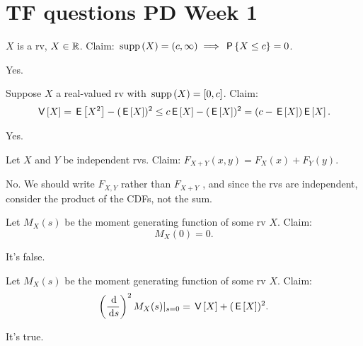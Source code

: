 \documentclass[tf-tutorial-all.tex]{subfiles}
\begin{document}
\setcounter{section}{0}
\section{TF questions PD Week 1}


\begin{truefalse}
$X$ is a rv, $X  \in \mathbb{R}$. Claim: $\,\mathrm{supp}\left(X\right) = (c, \infty) \implies \,\mathsf{P}\left\{X\leq c\right\} = 0$.
\begin{solution}
Yes.
\end{solution}
\end{truefalse}

\begin{truefalse}
Suppose $X$ a real-valued rv with $\,\mathrm{supp}\left(X\right) = [0, c]$. Claim:
\begin{equation}
\label{eq:3}
\,\mathsf{V}\left[X\right] = \,\mathsf{E}\left[X^2\right] - (\,\mathsf{E}\left[X\right])^2 \leq c \,\mathsf{E}\left[X\right] - (\,\mathsf{E}\left[X\right])^2 = (c-\,\mathsf{E}\left[X\right])\,\mathsf{E}\left[X\right].
\end{equation}
\begin{solution}
Yes.
\end{solution}
\end{truefalse}


\begin{truefalse}
Let $X$ and $Y$ be independent rvs. Claim: $F_{X+Y}(x, y) = F_X(x) + F_{Y}(y)$.
\begin{solution}
No. We should write $F_{X,Y}$ rather than $F_{X+Y}$ , and since the rvs are independent, consider the product of the CDFs, not the sum.
\end{solution}
\end{truefalse}

\begin{truefalse}
Let $M_{X}(s)$ be the moment generating function of some rv $X$.  Claim:
\begin{equation}
\label{eq:2}
M_{X}(0) = 0.
\end{equation}
\begin{solution}
It's false.
\end{solution}
\end{truefalse}


\begin{truefalse}
Let $M_{X}(s)$ be the moment generating function of some rv $X$.  Claim:
\begin{equation}
\label{eq:2}
\left(\frac{\d}{\d s}\right)^{2 }M_{X}(s)|_{s=0} =  \V X + (\E{X})^{2}.
\end{equation}
\begin{solution}
It's true.
\end{solution}
\end{truefalse}
\end{document}
